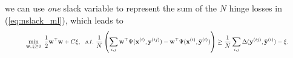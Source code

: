 we can use \emph{one} slack variable to represent the sum of the $N$ hinge losses in (\ref{eq:nslack_ml}),
which leads to %
\begin{equation*}
\resizebox{0.9\linewidth}{!}{$
\begin{aligned}
\min_{\w, \, \xi \ge 0} ~\frac{1}{2} \w^\top \w + C \xi, ~~s.t.~ \frac{1}{N} \left( \sum_{i,j} \w^\top \Psi(\x^{(i)}, \y^{(ij)}) - \w^\top \Psi(\x^{(i)}, \bar{\y}^{(i)}) \right) 
  \ge \frac{1}{N} \sum_{i,j} \Delta(\y^{(ij)}, \bar{\y}^{(i)}) - \xi.
\end{aligned}
$}
\end{equation*}

